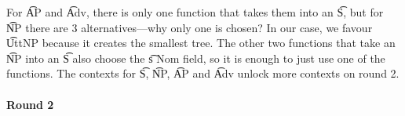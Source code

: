 \begin{EmptyItem}
\begin{HighlightingFancy}[]
    \OtherTok{::=} 
  \OtherTok{::=}   \NormalTok{\}} 
   \OtherTok{::=}   \NormalTok{\}}
  \OtherTok{::=}   \NormalTok{\}}
   \OtherTok{::=} \NormalTok{\{ \}}
 \OtherTok{::=} \NormalTok{\{ \}}
 \OtherTok{::=} \NormalTok{\{ \}}
\end{HighlightingFancy}
\end{EmptyItem}

\noindent For \t{AP} and \t{Adv}, there is only one function that
takes them into an \t{S}, but for \t{NP} there are 3
alternatives---why only one is chosen? In our case, we favour
\t{UttNP} because it creates the smallest tree. The other two
functions that take an \t{NP} into an \t{S} also choose the \t{s Nom}
field, so it is enough to just use one of the functions.
The contexts for \t{S}, \t{NP}, \t{AP} and \t{Adv}
unlock more contexts on round 2.

\paragraph{Round 2}

